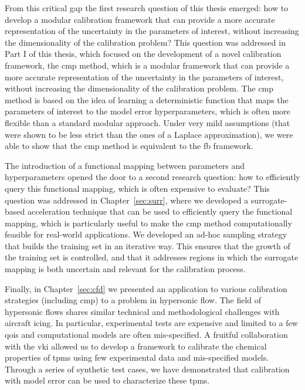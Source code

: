 \smallskip
From this critical gap the first research question of this thesis emerged: how to develop a modular calibration framework that can provide a more accurate representation of the uncertainty in the parameters of interest, without increasing the dimensionality of the calibration problem? This question was addressed in Part I of this thesis, which focused on the development of a novel calibration framework, the \gls{cmp} method, which is a modular framework that can provide a more accurate representation of the uncertainty in the parameters of interest, without increasing the dimensionality of the calibration problem. The \gls{cmp} method is based on the idea of learning a deterministic function that maps the parameters of interest to the model error hyperparameters, which is often more flexible than a standard modular approach. Under very mild assumptions (that were shown to be less strict than the ones of a Laplace approximation), we were able to show that the \gls{cmp} method is equivalent to the \gls{fb} framework.

\smallskip
The introduction of a functional mapping between parameters and hyperparameters opened the door to a second research question: how to efficiently query this functional mapping, which is often expensive to evaluate? This question was addressed in Chapter~\ref{sec:surr}, where we developed a surrogate-based acceleration technique that can be used to efficiently query the functional mapping, which is particularly useful to make the \gls{cmp} method computationally feasible for real-world applications. We developed an ad-hoc sampling strategy that builds the training set in an iterative way. This ensures that the growth of the training set is controlled, and that it addresses regions in which the surrogate mapping is both uncertain and relevant for the calibration process. 

\smallskip
Finally, in Chapter~\ref{sec:cfd} we presented an application to various calibration strategies (including \gls{cmp}) to a problem in hypersonic flow. The field of hypersonic flows shares similar technical and methodological challenges with aircraft icing. In particular, experimental tests are expensive and limited to a few \glspl{qoi} and computational models are often mis-specified. A fruitful collaboration with the \gls{vki} allowed us to develop a framework to calibrate the chemical properties of \glspl{tpm} using few experimental data and mis-specified models. Through a series of synthetic test cases, we have demonstrated that calibration with model error can be used to characterize these \glspl{tpm}.

